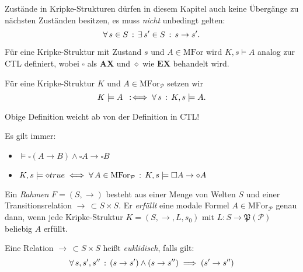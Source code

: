 \documentclass{cheat-sheet}
\newcommand{\lra}{\leftrightarrow}
\newcommand{\MFor}{\mathrm{MFor}} %
\newcommand{\AX}{\mathbf{AX}}
\newcommand{\EX}{\mathbf{EX}}
\begin{document}
\begin{defn}
  Zustände in Kripke-Strukturen dürfen in diesem Kapitel auch keine Übergänge zu nächsten Zuständen besitzen, \dh{} es muss \textit{nicht} unbedingt gelten:
  \[ \forall \, {s \in S} \,:\, \exists \, {s' \in S} \,:\, s \to s'.\]
\end{defn}

\begin{defn}
  Für eine Kripke-Struktur mit Zustand $s$ und $A \in \MFor$ wird $K, s \models A$ analog zur CTL definiert, wobei $\square$ als $\AX$ und $\diamond$ wie $\EX$ behandelt wird.
\end{defn}

\begin{defn}
  Für eine Kripke-Struktur $K$ und $A \in \MFor_{\mathcal{P}}$ setzen wir
  \[ K \models A \enspace:\!\iff \forall \, {s} \,:\, K, s \models A. \]
\end{defn}

\begin{acht}
  Obige Definition weicht ab von der Definition in CTL!
\end{acht}

\begin{bem}
  Es gilt immer: \enspace \begin{minipage}{0.5\linewidth}\begin{itemize}\item $\models \square (A \to B) \wedge \square A \to \square B$\end{itemize}\end{minipage}
  \begin{itemize}
    \miniitem{0.44 \linewidth}{$\models \square (A \wedge B) \lra (\square A \wedge \square B)$}
    \miniitem{0.44 \linewidth}{$\models \diamond (A \vee B) \lra (\diamond A \vee \diamond B)$}
    \item $K, s \models \diamond true \iff \fa{A \in \MFor_{\mathcal{P}}} K, s \models \square A \to \diamond A$
  \end{itemize}
\end{bem}

\begin{defn}
  Ein \emph{Rahmen} $F = (S, \to)$ besteht aus einer Menge von Welten $S$ und einer Transitionsrelation $\to \, \subset S \times S$. Er \emph{erfüllt} eine modale Formel $A \in \MFor_{\mathcal{P}}$ genau dann, wenn jede Kripke-Struktur $K = (S, \to, L, s_0)$ mit $L : S \to \mathfrak{P}(\mathcal{P})$ beliebig $A$ erfüllt.
\end{defn}

\begin{defn}
  Eine Relation $\to \, \subset S \times S$ heißt \emph{euklidisch}, falls gilt:
  \[ \forall \, {s, s', s''} \,:\, (s \to s') \wedge (s \to s'') \implies (s' \to s'') \]
\end{defn}
\end{document}
